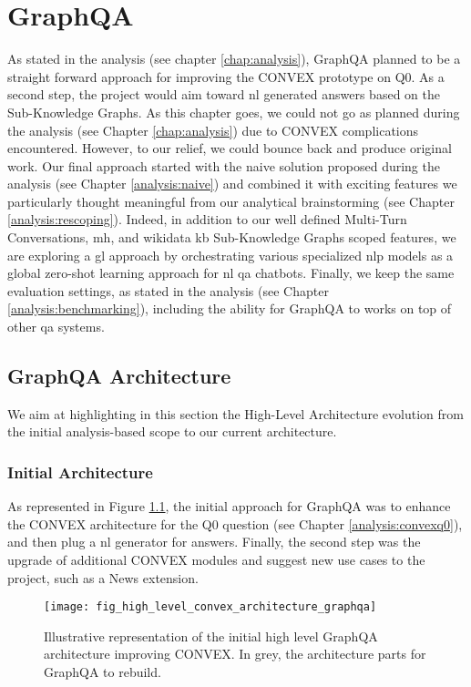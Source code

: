 \chapter{GraphQA}
\label{chap:graphqa}

As stated in the analysis (see chapter \ref{chap:analysis}), GraphQA planned to be a straight forward approach for improving the CONVEX \autocite{paper:convex} prototype on Q0. As a second step, the project would aim toward \gls{nl} generated answers based on the Sub-Knowledge Graphs. As this chapter goes, we could not go as planned during the analysis (see Chapter \ref{chap:analysis}) due to CONVEX complications encountered. However, to our relief, we could bounce back and produce original work. Our final approach started with the naive solution proposed during the analysis (see Chapter \ref{analysis:naive}) and combined it with exciting features we particularly thought meaningful from our analytical brainstorming (see Chapter \ref{analysis:rescoping}). Indeed, in addition to our well defined Multi-Turn Conversations, \gls{mh}, and \gls{wikidata} \gls{kb} Sub-Knowledge Graphs scoped features, we are exploring a \gls{gl} approach by orchestrating various specialized \gls{nlp} models as a global \gls{zero-shot} learning approach for \gls{nl} \gls{qa} chatbots. Finally, we keep the same evaluation settings, as stated in the analysis (see Chapter \ref{analysis:benchmarking}), including the ability for GraphQA to works on top of other \gls{qa} systems.

\section{GraphQA Architecture}
We aim at highlighting in this section the High-Level Architecture evolution from the initial analysis-based scope to our current architecture.

\subsection{Initial Architecture}
\label{graphqa:initial}
As represented in Figure \ref{fig:fig_high_level_convex_architecture_graphqa}, the initial approach for GraphQA was to enhance the CONVEX architecture for the Q0 question (see Chapter \ref{analysis:convexq0}), and then plug a \gls{nl} generator for answers. Finally, the second step was the upgrade of additional CONVEX modules and suggest new use cases to the project, such as a News extension.

\begin{figure}
    \centering
    \texttt{[image: fig\_high\_level\_convex\_architecture\_graphqa]}
    \caption{Illustrative representation of the initial high level GraphQA architecture improving CONVEX. In grey, the architecture parts for GraphQA to rebuild.}
    \label{fig:fig_high_level_convex_architecture_graphqa}
\end{figure}



